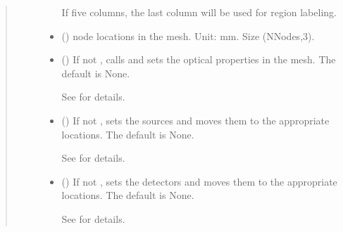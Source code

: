 \documentclass[letterpaper,10pt,english]{sphinxmanual}
\begin{document}
\begin{fulllineitems}
\begin{fulllineitems}
\begin{quote}
\begin{description}
\begin{itemize}
\sphinxAtStartPar
If five columns, the last column will be used for region labeling.


\item {} 
\sphinxAtStartPar
{} () \textendash{} node locations in the mesh. Unit: mm. Size (NNodes,3).

\item {} 
\sphinxAtStartPar
{} (\sphinxstyleliteralemphasis{\sphinxupquote{, }}) \textendash{} 
\sphinxAtStartPar
If not , calls  and sets the optical properties in the mesh. The default is None.

\sphinxAtStartPar
See {\hyperref[\detokenize{_autosummary/nirfasterff.base.stnd_mesh.stndmesh:nirfasterff.base.stnd_mesh.stndmesh.set_prop}]{}} for details.


\item {} 
\sphinxAtStartPar
{} (\sphinxstyleliteralemphasis{\sphinxupquote{, }}) \textendash{} 
\sphinxAtStartPar
If not , sets the sources and moves them to the appropriate locations. The default is None.

\sphinxAtStartPar
See {\hyperref[\detokenize{_autosummary/nirfasterff.base.optodes.optode:nirfasterff.base.optodes.optode.touch_sources}]{}} for details.


\item {} 
\sphinxAtStartPar
{} (\sphinxstyleliteralemphasis{\sphinxupquote{, }}) \textendash{} 
\sphinxAtStartPar
If not , sets the detectors and moves them to the appropriate locations. The default is None.

\sphinxAtStartPar
See {\hyperref[\detokenize{_autosummary/nirfasterff.base.optodes.optode:nirfasterff.base.optodes.optode.touch_detectors}]{}} for details.



\end{itemize}
\end{description}
\end{quote}
\end{fulllineitems}
\end{fulllineitems}
\end{document}
